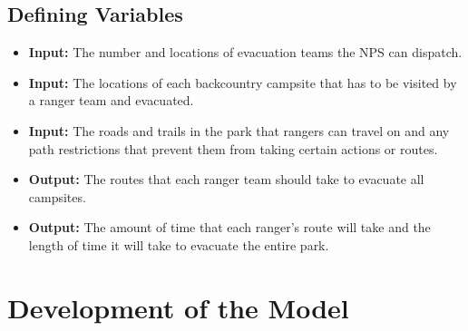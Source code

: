 \documentclass[12pt]{article}
\begin{document}
\subsection{Defining Variables}
\begin{itemize}
    \item \textbf{Input:} The number and locations of evacuation teams the NPS can dispatch.
    \item \textbf{Input:} The locations of each backcountry campsite that has to be visited by a ranger team and evacuated.
    \item \textbf{Input:} The roads and trails in the park that rangers can travel on and any path restrictions that prevent them from taking certain actions or routes.
    \item \textbf{Output:} The routes that each ranger team should take to evacuate all campsites.
    \item \textbf{Output:} The amount of time that each ranger's route will take and the length of time it will take to evacuate the entire park.
    
\end{itemize}

\section{Development of the Model}
\end{document}
